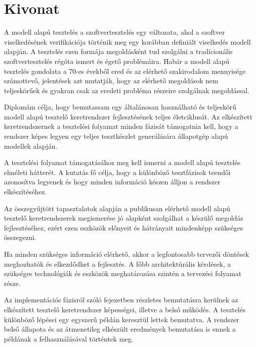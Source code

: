 \setcounter{page}{1}

\hungarianParagraph


\chapter*{Kivonat}
\label{cha:kivonat}

A modell alapú tesztelés a szoftvertesztelés egy változata, ahol a szoftver viselkedésének verifikációja történik meg egy korábban definiált viselkedés modell alapján. A tesztelés ezen formája megoldásként tud szolgálni a tradícionális szoftvertesztelés régóta ismert és égető problémáira. Habár a modell alapú tesztelés gondolata a 70-es évekből ered és az elérhető szakirodalom mennyisége számottevő, jelentések azt mutatják, hogy az elérhető megoldások nem teljeskörűek és gyakran csak az eredeti probléma részeire szolgálnak megoldással.

Diplomám célja, hogy bemutassam egy általánosan használható és teljeskörű modell alapú tesztelő keretrendszer fejlesztésének teljes életciklusát. Az elkészített keretrendszernek a tesztelési folyamat minden fázisát támogatnia kell, hogy a rendszer képes legyen egy teljes tesztkészlet generálására állapotgép alapú modellek alapján.

A tesztelési folyamat támogatásához meg kell ismerni a modell alapú tesztelés elméleti hátterét. A kutatás fő célja, hogy a különböző tesztfázisok teendői azonosítva legyenek és hogy minden információ készen álljon a rendszer elkészítéséhez.

Az összegyűjtött tapasztalatok alapján a publikusan elérhető modell alapú tesztelő keretrendszerek megismerése jó alapként szolgálhat a készülő megoldás fejlesztéséhez, ezért ezen eszközök előnyeit és hátrányait mindenképp szükséges összegezni.

Ha minden szükséges információ elérhető, akkor a legfontosabb tervezői döntések meghozhatók és elkezdődhet a fejlesztés. A főbb architektúrális kérdések, a szükséges technológiák és eszközök meghatározása szintén a tervezési folyamat része.

Az implementációs fázisról szóló fejezetben részletes bemutatásra kerülnek az elkészített tesztelő keretrendszer képességei, illetve a belső működés. A tesztelés különböző lépései egy egyszerű példán keresztül lettek bemutatva. A rendszer belső állapota és az átmenetileg elkészült eredmények bemutatása is ennek a példának a felhasználásával történtek meg.

